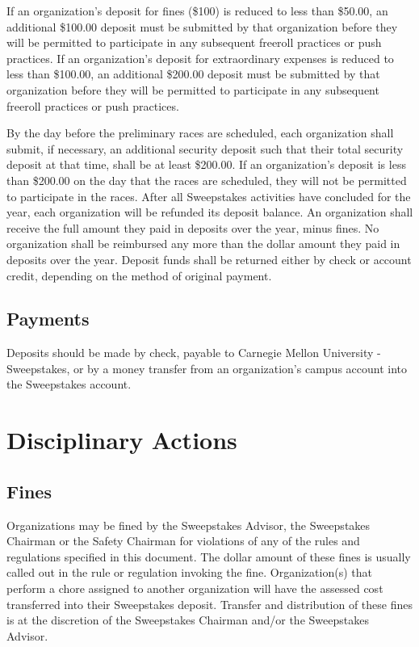 	If an organization's deposit for fines (\$100) is reduced to less than \$50.00, an additional \$100.00 deposit must be submitted by that organization before they will be permitted to participate in any subsequent freeroll practices or push practices. If an organization's deposit for extraordinary expenses is reduced to less than \$100.00, an additional \$200.00 deposit must be submitted by that organization before they will be permitted to participate in any subsequent freeroll practices or push practices.

	By the day before the preliminary races are scheduled, each organization shall submit, if necessary, an additional security deposit such that their total security deposit at that time, shall be at least \$200.00. If an organization's deposit is less than \$200.00 on the day that the races are scheduled, they will not be permitted to participate in the races. After all Sweepstakes activities have concluded for the year, each organization will be refunded its deposit balance. An organization shall receive the full amount they paid in deposits over the year, minus fines. No organization shall be reimbursed any more than the dollar amount they paid in deposits over the year. Deposit funds shall be returned either by check or account credit, depending on the method of original payment.

\subsection{Payments}

	Deposits should be made by check, payable to Carnegie Mellon University - Sweepstakes, or by a money transfer from an organization's campus account into the Sweepstakes account.

\section{Disciplinary Actions}
\label{sec:DiciplinaryActions}

\subsection{Fines}

	Organizations may be fined by the Sweepstakes Advisor, the Sweepstakes Chairman or the Safety Chairman for violations of any of the rules and regulations specified in this document. The dollar amount of these fines is usually called out in the rule or regulation invoking the fine. Organization(s) that perform a chore assigned to another organization will have the assessed cost transferred into their Sweepstakes deposit. Transfer and distribution of these fines is at the discretion of the Sweepstakes Chairman and/or the Sweepstakes Advisor.

